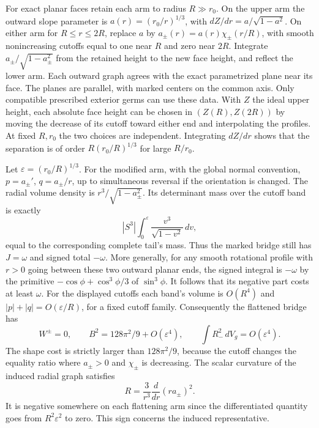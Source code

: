 \documentclass[11pt,letterpaper]{article}
\numberwithin{equation}{section}
\begin{document}
For exact planar faces retain each arm to radius \(R\gg r_0\).
On the upper arm the outward slope parameter is
\(a(r)=(r_0/r)^{1/3}\), with \(dZ/dr=a/\sqrt{1-a^2}\).
On either arm for \(R\le r\le2R\), replace \(a\) by
\(a_\pm(r)=a(r)\chi_\pm(r/R)\), with smooth nonincreasing
cutoffs equal to one near \(R\) and zero near \(2R\).
Integrate \(a_\pm/\sqrt{1-a_\pm^2}\) from the retained
height to the new face height, and reflect the lower
arm. Each outward graph agrees with the exact parametrized
plane near its face. The planes are parallel, with
marked centers on the common axis. Only compatible
prescribed exterior germs can use these data. With \(Z\) the
ideal upper height, each absolute face height can be chosen
in \((Z(R),Z(2R))\) by moving the decrease of its cutoff
toward either end and interpolating the profiles. At fixed
\(R,r_0\) the two choices are independent. Integrating
\(dZ/dr\) shows that the separation is of order
\(R(r_0/R)^{1/3}\) for large \(R/r_0\).

Let \(\varepsilon=(r_0/R)^{1/3}\).
For the modified arm, with the global normal convention,
\(p=a_\pm'\), \(q=a_\pm/r\), up to simultaneous reversal
if the orientation is changed. The radial volume density
is \(r^3/\sqrt{1-a_\pm^2}\). Its determinant mass over the
cutoff band is exactly
\[
 |S^3|\int_0^\varepsilon \frac{v^3}{\sqrt{1-v^2}}\,dv,
\]
equal to the corresponding complete tail's mass. Thus
the marked bridge still has \(J=\omega\) and signed total
\(-\omega\). More generally, for any smooth rotational profile
with \(r>0\) going between these two outward planar ends,
the signed integral is \(-\omega\) by the primitive
\(-\cos\phi+\cos^3\phi/3\) of \(\sin^3\phi\).
It follows that its negative part costs at least \(\omega\).
For the displayed cutoffs each band's volume is \(O(R^4)\)
and \(|p|+|q|=O(\varepsilon/R)\), for a fixed cutoff family.
Consequently the flattened bridge has
\[
 W^\pm=0,\qquad B^2=128\pi^2/9+O(\varepsilon^4),\qquad
 \int R_-^2\,dV_g=O(\varepsilon^4).
\]
The shape cost is strictly larger than \(128\pi^2/9\),
because the cutoff changes the equality ratio where
\(a_\pm>0\) and \(\chi_\pm\) is decreasing. The scalar
curvature of the induced radial graph satisfies
\[
 R=\frac3{r^3}\frac{d}{dr}(r a_\pm)^2 .
\]
It is negative somewhere on each flattening arm since
the differentiated quantity goes from \(R^2\varepsilon^2\)
to zero. This sign concerns the induced representative.
\end{document}

